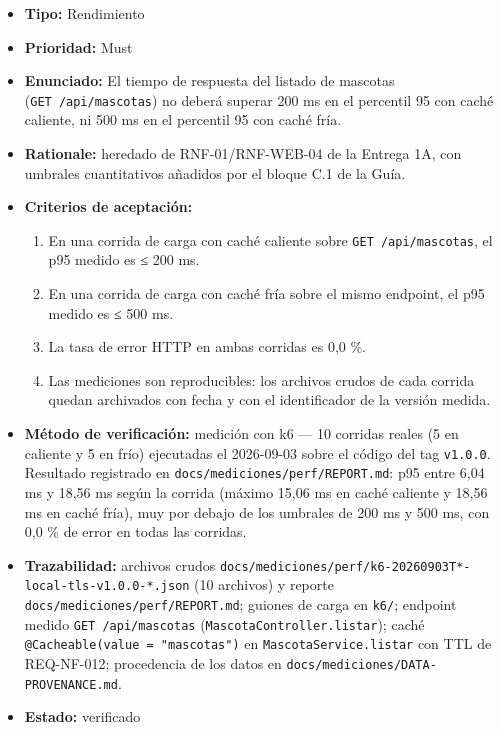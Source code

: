 \documentclass[
  spanish,
]{article}
\providecommand{\tightlist}{%
  \setlength{\itemsep}{0pt}\setlength{\parskip}{0pt}}
\begin{document}
\begin{itemize}
\tightlist
\item
  \textbf{Tipo:} Rendimiento
\item
  \textbf{Prioridad:} Must
\item
  \textbf{Enunciado:} El tiempo de respuesta del listado de mascotas
  (\texttt{GET\ /\allowbreak{}api/\allowbreak{}mascotas}) no deberá superar 200 ms en el percentil
  95 con caché caliente, ni 500 ms en el percentil 95 con caché fría.
\item
  \textbf{Rationale:} heredado de RNF-01/RNF-WEB-04 de la Entrega 1A,
  con umbrales cuantitativos añadidos por el bloque C.1 de la Guía.
\item
  \textbf{Criterios de aceptación:}

  \begin{enumerate}
  \def\labelenumi{\arabic{enumi}.}
  \tightlist
  \item
    En una corrida de carga con caché caliente sobre
    \texttt{GET\ /\allowbreak{}api/\allowbreak{}mascotas}, el p95 medido es ≤ 200 ms.
  \item
    En una corrida de carga con caché fría sobre el mismo endpoint, el
    p95 medido es ≤ 500 ms.
  \item
    La tasa de error HTTP en ambas corridas es 0,0 \%.
  \item
    Las mediciones son reproducibles: los archivos crudos de cada
    corrida quedan archivados con fecha y con el identificador de la
    versión medida.
  \end{enumerate}
\item
  \textbf{Método de verificación:} medición con k6 --- 10 corridas
  reales (5 en caliente y 5 en frío) ejecutadas el 2026-09-03 sobre el
  código del tag \texttt{v1.\allowbreak{}0.\allowbreak{}0}. Resultado registrado en
  \texttt{docs/\allowbreak{}mediciones/\allowbreak{}perf/\allowbreak{}REPORT.\allowbreak{}md}: p95 entre 6,04 ms y 18,56 ms
  según la corrida (máximo 15,06 ms en caché caliente y 18,56 ms en
  caché fría), muy por debajo de los umbrales de 200 ms y 500 ms, con
  0,0 \% de error en todas las corridas.
\item
  \textbf{Trazabilidad:} archivos crudos
  \texttt{docs/\allowbreak{}mediciones/\allowbreak{}perf/\allowbreak{}k6-\allowbreak{}20260903\allowbreak{}T*-\allowbreak{}local-\allowbreak{}tls-\allowbreak{}v1.\allowbreak{}0.\allowbreak{}0-*.\allowbreak{}json}
  (10 archivos) y reporte \texttt{docs/\allowbreak{}mediciones/\allowbreak{}perf/\allowbreak{}REPORT.\allowbreak{}md};
  guiones de carga en \texttt{k6/}; endpoint medido
  \texttt{GET\ /\allowbreak{}api/\allowbreak{}mascotas} (\texttt{Mascota\allowbreak{}Controller.\allowbreak{}listar}); caché
  \texttt{@Cacheable(value\ =\ "\allowbreak{}mascotas")} en
  \texttt{Mascota\allowbreak{}Service.\allowbreak{}listar} con TTL de REQ-NF-012; procedencia de
  los datos en \texttt{docs/\allowbreak{}mediciones/\allowbreak{}DATA-\allowbreak{}PROVENANCE.\allowbreak{}md}.
\item
  \textbf{Estado:} verificado
\end{itemize}
\end{document}
